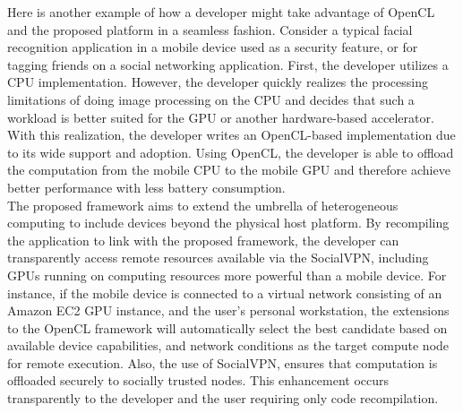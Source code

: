 %
Here is another example of how a developer might take advantage of
OpenCL and the proposed platform in a seamless fashion.
%
Consider a typical facial recognition application in a mobile device
used as a security feature, or for tagging friends on a social
networking application.
%
First, the developer utilizes a CPU implementation.
%
However, the developer quickly realizes the processing limitations of
doing image processing on the CPU and decides that such a workload is
better suited for the GPU or another hardware-based accelerator.
%
With this realization, the developer writes an OpenCL-based
implementation due to its wide support and adoption.
%
Using OpenCL, the developer is able to offload the computation from the
mobile CPU to the mobile GPU and therefore achieve better performance
with less battery consumption.\\
%
The proposed framework aims to extend the umbrella of heterogeneous
computing to include devices beyond the physical host platform.
%
By recompiling the application to link with the proposed framework, the
developer can transparently access remote resources available via the
SocialVPN, including GPUs running on computing resources more powerful
than a mobile device.
%
For instance, if the mobile device is connected to a virtual network
consisting of an Amazon EC2 GPU instance, and the user's personal
workstation, the extensions to the OpenCL framework will automatically
select the best candidate based on available device capabilities, and
network conditions as the target compute node for remote execution.
%
Also, the use of SocialVPN, ensures that computation is offloaded
securely to socially trusted nodes.
%
This enhancement occurs transparently to the developer and the user
requiring only code recompilation. 
%

